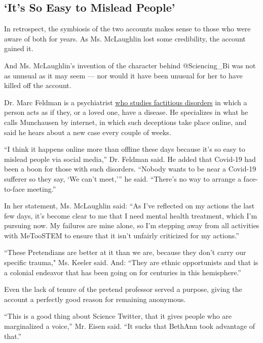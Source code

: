 \hypertarget{its-so-easy-to-mislead-people}{%
\subsection{`It's So Easy to Mislead
People'}\label{its-so-easy-to-mislead-people}}

In retrospect, the symbiosis of the two accounts makes sense to those
who were aware of both for years. As Ms. McLaughlin lost some
credibility, the account gained it.

And Ms. McLaughlin's invention of the character behind @Sciencing\_Bi
was not as unusual as it may seem --- nor would it have been unusual for
her to have killed off the account.

Dr. Marc Feldman is a psychiatrist
\href{https://www.nytimes3xbfgragh.onion/1999/07/20/science/a-great-pretender-now-faces-the-truth-of-illness.html}{who
studies factitious disorders} in which a person acts as if they, or a
loved one, have a disease. He specializes in what he calls Munchausen by
internet, in which such deceptions take place online, and said he hears
about a new case every couple of weeks.

``I think it happens online more than offline these days because it's so
easy to mislead people via social media,'' Dr. Feldman said. He added
that Covid-19 had been a boon for those with such disorders. ``Nobody
wants to be near a Covid-19 sufferer so they say, `We can't meet,''' he
said. ``There's no way to arrange a face-to-face meeting.''

In her statement, Ms. McLaughlin said: ``As I've reflected on my actions
the last few days, it's become clear to me that I need mental health
treatment, which I'm pursuing now. My failures are mine alone, so I'm
stepping away from all activities with MeTooSTEM to ensure that it isn't
unfairly criticized for my actions.''

``These Pretendians are better at it than we are, because they don't
carry our specific trauma," Ms. Keeler said. And: ``They are ethnic
opportunists and that is a colonial endeavor that has been going on for
centuries in this hemisphere.''

Even the lack of tenure of the pretend professor served a purpose,
giving the account a perfectly good reason for remaining anonymous.

``This is a good thing about Science Twitter, that it gives people who
are marginalized a voice,'' Mr. Eisen said. ``It sucks that BethAnn took
advantage of that.''

